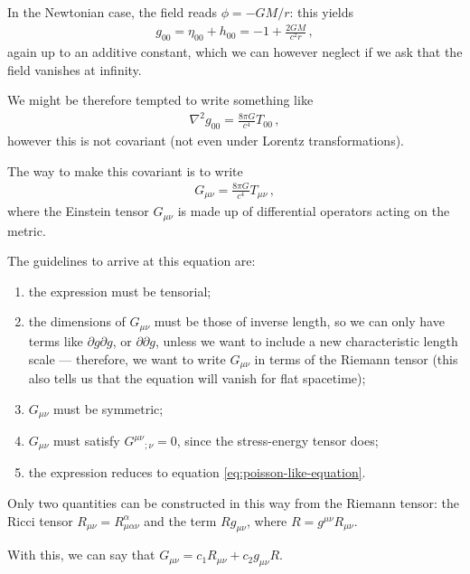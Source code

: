 \documentclass[main.tex]{subfiles}
\begin{document}
In the Newtonian case, the field reads \(\phi = - GM / r\): this yields 
%
\begin{align}
g_{00} = \eta_{00} + h_{00} = - 1 + \frac{2GM}{c^2 r}
\,,
\end{align}
%
again up to an additive constant, which we can however neglect if we ask that the field vanishes at infinity. 

We might be therefore tempted to write something like 
%
\begin{align} \label{eq:poisson-like-equation}
\nabla^2 g_{00} = \frac{8 \pi G}{c^{4}} T_{00} 
\,,
\end{align}
%
however this is not covariant (not even under Lorentz transformations). 

The way to make this covariant is to write 
%
\begin{align}
G_{\mu \nu } = \frac{8 \pi G}{c^{4}} T_{\mu \nu }
\,,
\end{align}
%
where the Einstein tensor \(G_{\mu \nu }\) is made up of differential operators acting on the metric. 

The guidelines to arrive at this equation are: 
\begin{enumerate}
    \item the expression must be tensorial;
    \item the dimensions of \(G_{\mu \nu }\) must be those of inverse length, so we can only have terms like \(\partial g \partial g\), or \(\partial \partial g\), unless we want to include a new characteristic length scale --- therefore, we want to write \(G_{\mu \nu }\) in terms of the Riemann tensor (this also tells us that the equation will vanish for flat spacetime);
    \item \(G_{\mu \nu }\) must be symmetric;
    \item \(G_{\mu \nu }\) must satisfy \(G^{\mu \nu }{}_{; \nu } = 0\), since the stress-energy tensor does; 
    \item the expression reduces to equation \eqref{eq:poisson-like-equation}.
\end{enumerate}

Only two quantities can be constructed in this way from the Riemann tensor: the Ricci tensor \(R_{\mu \nu } = R^{\alpha }_{\mu \alpha \nu }\) and the term \(R g_{\mu \nu }\), where \(R = g^{\mu \nu } R_{\mu \nu }\). 

With this, we can say that \(G_{\mu \nu } = c_1 R_{\mu \nu } + c_2 g_{\mu \nu } R\). 
\end{document}
